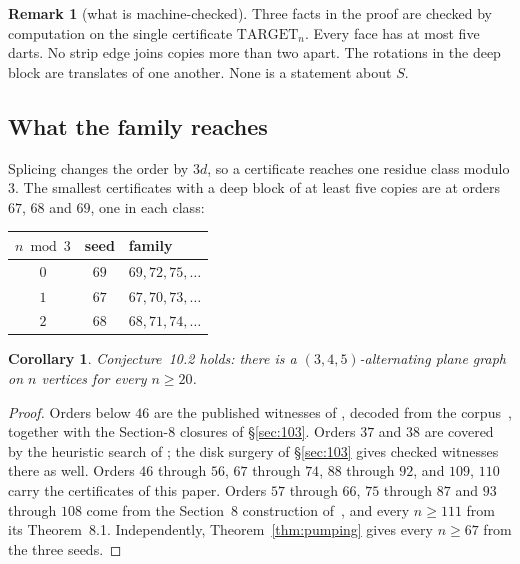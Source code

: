 \documentclass[11pt,a4paper]{amsart}
\theoremstyle{plain}
\newtheorem{corollary}[theorem]{Corollary}
\theoremstyle{definition}
\newtheorem{remark}[theorem]{Remark}
\begin{document}
\begin{remark}[what is machine-checked]\label{rem:hypotheses}
Three facts in the proof are checked by computation on the single certificate
$\mathrm{TARGET}_n$. Every face has at most five darts. No strip edge joins
copies more than two apart. The rotations in the deep block are translates of
one another. None is a statement about $S$.
\end{remark}

\subsection{What the family reaches}

Splicing changes the order by $3d$, so a certificate reaches one residue class
modulo $3$. The smallest certificates with a deep block of at least five copies
are at orders $67$, $68$ and $69$, one in each class:

\begin{center}
\begin{tabular}{ccl}
\toprule
$n \bmod 3$ & seed & family \\
\midrule
$0$ & $69$ & $69, 72, 75, \dots$ \\
$1$ & $67$ & $67, 70, 73, \dots$ \\
$2$ & $68$ & $68, 71, 74, \dots$ \\
\bottomrule
\end{tabular}
\end{center}

\begin{corollary}\label{cor:102}
Conjecture~10.2 holds: there is a $(3,4,5)$-alternating plane graph on $n$
vertices for every $n \ge 20$.
\end{corollary}

\begin{proof}
Orders below $46$ are the published witnesses of \cite{AHSSV2015}, decoded from
the corpus~\cite{APGcorpus}, together with the Section-8 closures of
\S\ref{sec:103}. Orders $37$ and $38$ are covered by the heuristic search of
\cite{AHSSV2015}; the disk surgery of \S\ref{sec:103} gives checked witnesses
there as well. Orders $46$ through $56$, $67$ through $74$, $88$ through $92$,
and $109$, $110$ carry the certificates of this paper. Orders $57$ through $66$,
$75$ through $87$ and $93$ through $108$ come from the Section~8 construction
of~\cite{AHSSV2015}, and every $n \ge 111$ from its Theorem~8.1. Independently,
Theorem~\ref{thm:pumping} gives every $n \ge 67$ from the three seeds.
\end{proof}
\end{document}

